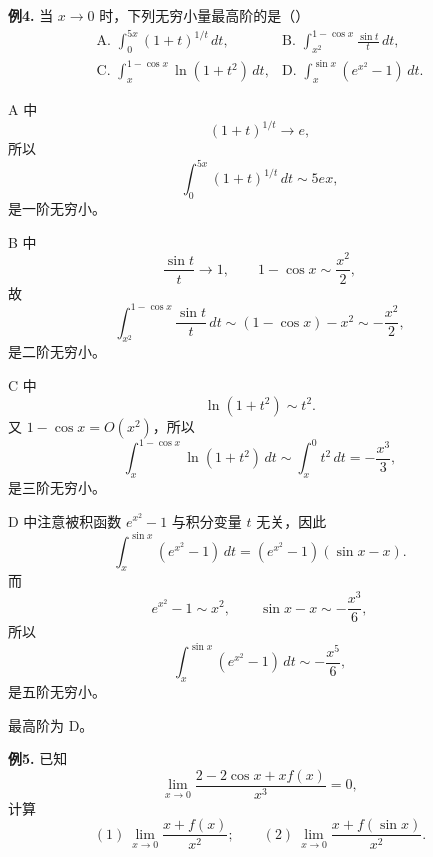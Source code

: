 \begin{problemblock}
\textbf{例4.} 当 \(x\to0\) 时，下列无穷小量最高阶的是（\quad）
\[
\begin{array}{ll}
\text{A. }\displaystyle\int_0^{5x}(1+t)^{1/t}\,dt,&
\text{B. }\displaystyle\int_{x^2}^{1-\cos x}\frac{\sin t}{t}\,dt,\\[2mm]
\text{C. }\displaystyle\int_x^{1-\cos x}\ln(1+t^2)\,dt,&
\text{D. }\displaystyle\int_x^{\sin x}(e^{x^2}-1)\,dt.
\end{array}
\]
\end{problemblock}

\begin{solutionblock}

A 中
\[
(1+t)^{1/t}\to e,
\]
所以
\[
\int_0^{5x}(1+t)^{1/t}\,dt\sim 5ex,
\]
是一阶无穷小。

B 中
\[
\frac{\sin t}{t}\to1,\qquad 1-\cos x\sim\frac{x^2}{2},
\]
故
\[
\int_{x^2}^{1-\cos x}\frac{\sin t}{t}\,dt
\sim (1-\cos x)-x^2
\sim -\frac{x^2}{2},
\]
是二阶无穷小。

C 中
\[
\ln(1+t^2)\sim t^2.
\]
又 \(1-\cos x=O(x^2)\)，所以
\[
\int_x^{1-\cos x}\ln(1+t^2)\,dt
\sim\int_x^0t^2\,dt=-\frac{x^3}{3},
\]
是三阶无穷小。

D 中注意被积函数 \(e^{x^2}-1\) 与积分变量 \(t\) 无关，因此
\[
\int_x^{\sin x}(e^{x^2}-1)\,dt
=(e^{x^2}-1)(\sin x-x).
\]
而
\[
e^{x^2}-1\sim x^2,\qquad \sin x-x\sim-\frac{x^3}{6},
\]
所以
\[
\int_x^{\sin x}(e^{x^2}-1)\,dt
\sim-\frac{x^5}{6},
\]
是五阶无穷小。

最高阶为 D。

\end{solutionblock}

\begin{problemblock}
\textbf{例5.} 已知
\[
\lim_{x\to0}\frac{2-2\cos x+x f(x)}{x^3}=0,
\]
计算
\[
(1)\ \lim_{x\to0}\frac{x+f(x)}{x^2};\qquad
(2)\ \lim_{x\to0}\frac{x+f(\sin x)}{x^2}.
\]
\end{problemblock}

